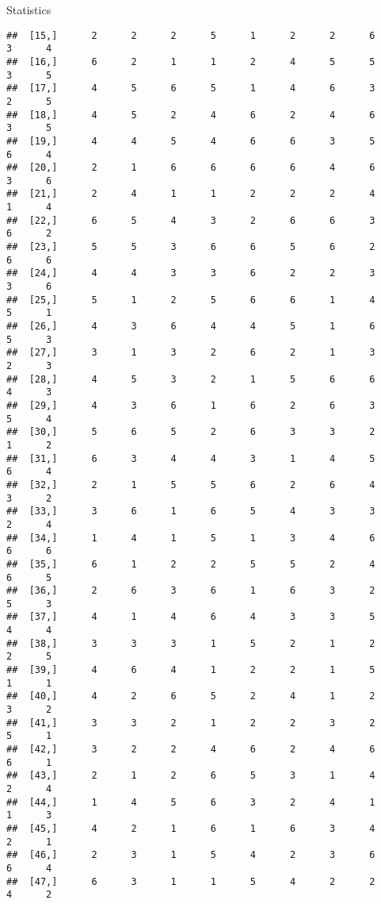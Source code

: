 \documentclass[
  ignorenonframetext,
]{beamer}
\begin{document}
\begin{frame}[fragile]{Statistics}
\begin{verbatim}
##  [15,]      2      2      2      5      1      2      2      6      3      4
##  [16,]      6      2      1      1      2      4      5      5      3      5
##  [17,]      4      5      6      5      1      4      6      3      2      5
##  [18,]      4      5      2      4      6      2      4      6      3      5
##  [19,]      4      4      5      4      6      6      3      5      6      4
##  [20,]      2      1      6      6      6      6      4      6      3      6
##  [21,]      2      4      1      1      2      2      2      4      1      4
##  [22,]      6      5      4      3      2      6      6      3      6      2
##  [23,]      5      5      3      6      6      5      6      2      6      6
##  [24,]      4      4      3      3      6      2      2      3      3      6
##  [25,]      5      1      2      5      6      6      1      4      5      1
##  [26,]      4      3      6      4      4      5      1      6      5      3
##  [27,]      3      1      3      2      6      2      1      3      2      3
##  [28,]      4      5      3      2      1      5      6      6      4      3
##  [29,]      4      3      6      1      6      2      6      3      5      4
##  [30,]      5      6      5      2      6      3      3      2      1      2
##  [31,]      6      3      4      4      3      1      4      5      6      4
##  [32,]      2      1      5      5      6      2      6      4      3      2
##  [33,]      3      6      1      6      5      4      3      3      2      4
##  [34,]      1      4      1      5      1      3      4      6      6      6
##  [35,]      6      1      2      2      5      5      2      4      6      5
##  [36,]      2      6      3      6      1      6      3      2      5      3
##  [37,]      4      1      4      6      4      3      3      5      4      4
##  [38,]      3      3      3      1      5      2      1      2      2      5
##  [39,]      4      6      4      1      2      2      1      5      1      1
##  [40,]      4      2      6      5      2      4      1      2      3      2
##  [41,]      3      3      2      1      2      2      3      2      5      1
##  [42,]      3      2      2      4      6      2      4      6      6      1
##  [43,]      2      1      2      6      5      3      1      4      2      4
##  [44,]      1      4      5      6      3      2      4      1      1      3
##  [45,]      4      2      1      6      1      6      3      4      2      1
##  [46,]      2      3      1      5      4      2      3      6      6      4
##  [47,]      6      3      1      1      5      4      2      2      4      2

\end{verbatim}
\end{frame}
\end{document}
